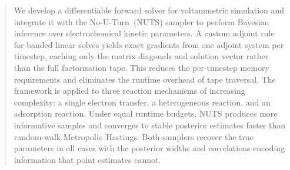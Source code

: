 \begin{abstract}
  We develop a differentiable forward solver for voltammetric simulation
  and integrate it with the No-U-Turn~(NUTS) sampler to perform Bayesian
  inference over electrochemical kinetic parameters.
  A custom adjoint rule for banded linear solves yields exact
  gradients from one adjoint system per timestep, caching only the
  matrix diagonals and solution vector rather than the full
  factorisation tape. This reduces the per-timestep memory
  requirements and eliminates the runtime overhead of tape traversal.
  The framework is applied to three reaction mechanisms of increasing
  complexity: a single electron transfer, a heterogeneous reaction,
  and an adsorption reaction. Under equal runtime budgets, NUTS
  produces more informative samples and converges to stable posterior
  estimates faster than random-walk Metropolis--Hastings. Both
  samplers recover the true parameters in all cases with the
  posterior widths  and correlations  encoding information that point
  estimates cannot.
\end{abstract}
